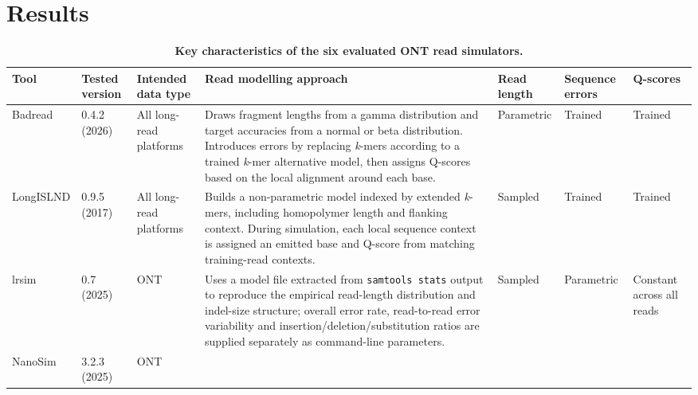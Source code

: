 \documentclass[webpdf,modern,large]{biorxiv}
\begin{document}
\section{Results}

\begin{table}[t]
\centering
\small
\setlength{\tabcolsep}{3pt}
\caption[Key characteristics of ONT read simulators]{\textbf{Key characteristics of the six evaluated ONT read simulators.}}
\label{tab:simulators}
\renewcommand{\arraystretch}{1.15}
\begin{tabular}{
>{\raggedright\arraybackslash}m{}
>{\raggedright\arraybackslash}m{}
>{\raggedright\arraybackslash}m{}
>{\raggedright\arraybackslash}m{}
>{\raggedright\arraybackslash}m{}
>{\raggedright\arraybackslash}m{}
>{\raggedright\arraybackslash}m{}
}
\toprule
\textbf{Tool} &
\textbf{Tested version} &
\textbf{Intended data type} &
\textbf{Read modelling approach} &
\textbf{Read length} &
\textbf{Sequence errors} &
\textbf{Q-scores} \\
\midrule
Badread &
\makecell[l]{0.4.2\\(2026)} &
All long-read platforms &
Draws fragment lengths from a gamma distribution and target accuracies from a normal or beta distribution. Introduces errors by replacing \textit{k}-mers according to a trained \textit{k}-mer alternative model, then assigns Q-scores based on the local alignment around each base. &
Parametric & Trained & Trained \\
\midrule
LongISLND &
\makecell[l]{0.9.5\\(2017)} &
All long-read platforms &
Builds a non-parametric model indexed by extended \textit{k}-mers, including homopolymer length and flanking context. During simulation, each local sequence context is assigned an emitted base and Q-score from matching training-read contexts. &
Sampled & Trained & Trained \\
\midrule
lrsim &
\makecell[l]{0.7\\(2025)} &
ONT &
Uses a model file extracted from \texttt{samtools stats} output to reproduce the empirical read-length distribution and indel-size structure; overall error rate, read-to-read error variability and insertion/deletion/substitution ratios are supplied separately as command-line parameters. &
Sampled & Parametric & Constant across all reads \\
\midrule
NanoSim &
\makecell[l]{3.2.3\\(2025)} &
ONT &

\end{tabular}
\end{table}
\end{document}
